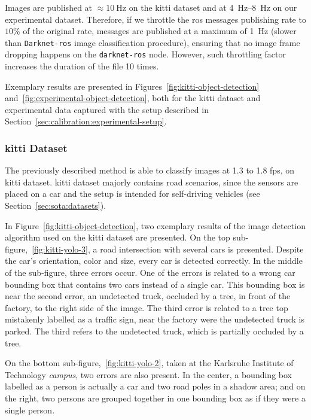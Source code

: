 Images are published at $\approx\SI{10}{\hertz}$ on the \ac{kitti} dataset and at \SIrange[range-units=single]{4}{8}{\hertz} on our experimental dataset. Therefore, if we throttle the \ac{ros} messages publishing rate to $10\%$ of the original rate, messages are published at a maximum of \SI{1}{\hertz} (slower than \texttt{Darknet-ros} image classification procedure), ensuring that no image frame dropping happens on the \texttt{darknet-ros} node. However, such throttling factor increases the duration of the file 10 times.

Exemplary results are presented in Figures~\ref{fig:kitti-object-detection} and~\ref{fig:experimental-object-detection}, both for the \ac{kitti} dataset and experimental data captured with the setup described in Section~\ref{sec:calibration:experimental-setup}.
	
\subsubsection{\acs{kitti} Dataset}
The previously described method is able to classify images at 1.3 to 1.8 \ac{fps}, on \ac{kitti} dataset. \ac{kitti} dataset majorly contains road scenarios, since the sensors are placed on a car and the setup is intended for self-driving vehicles (see Section~\ref{sec:sota:datasets}).

In Figure~\ref{fig:kitti-object-detection}, two exemplary results of the image detection algorithm used on the \ac{kitti} dataset are presented. On the top sub-figure,~\ref{fig:kitti-yolo-3}, a road intersection with several cars is presented. Despite the car's orientation, color and size, every car is detected correctly. In the middle of the sub-figure, three errors occur. One of the errors is related to a wrong car bounding box that contains two cars instead of a single car. This bounding box is near the second error, an undetected truck, occluded by a tree, in front of the factory, to the right side of the image. The third error is related to a tree top mistakenly labelled as a traffic sign, near the factory were the undetected truck is parked. The third refers to the undetected truck, which is partially occluded by a tree.

On the bottom sub-figure,~\ref{fig:kitti-yolo-2}, taken at the Karlsruhe Institute of Technology \textit{campus}, two errors are also present. In the center, a bounding box labelled as a person is actually a car and two road poles in a shadow area; and on the right, two persons are grouped together in one bounding box as if they were a single person.
	
